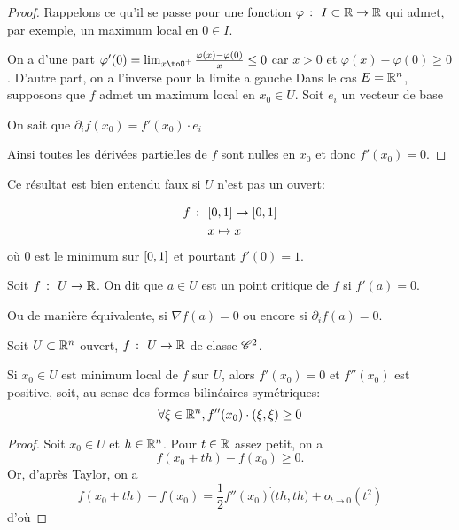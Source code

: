\begin{proof}
    Rappelons ce qu'il se passe pour une fonction \(\varphi\ \colon\ I\subset \mathbb{R}\to\mathbb{R}\) qui
    admet, par exemple, un maximum local en \(0\in I\).

    On a d'une part \(\varphi'(0) = \lim_{x\toO^+}\frac{\varphi(x)-\varphi(0)}{x}\leq 0\)
    car \(x>0\) et \(\varphi(x) - \varphi(0)\geq 0\).
    D'autre part, on a l'inverse pour la limite a gauche %
    Dans le cas \(E = \mathbb{R}^n\), supposons que \(f\) admet un maximum local en \(x_0\in U\).
    Soit \(e_i\) un vecteur de base

    On sait que \(\partial_i f(x_0) = f'(x_0)\cdot e_i\) %


    Ainsi toutes les dérivées partielles de \(f\) sont nulles en \(x_0\) et donc
    \(f'(x_0) = 0\).
\end{proof}

\begin{remark}
    Ce résultat est bien entendu faux si \(U\) n'est pas un ouvert:

    \begin{equation*}
        \begin{aligned}
            f\ \colon\  &\mathopen{}\left[0,1\right]\mathclose{}\to\mathopen{}\left[0,1\right]\mathclose{}\\
            &x\mapsto x
        \end{aligned}
    \end{equation*}
    où 0 est le minimum sur \(\mathopen{}\left[0,1\right]\mathclose{}\) et pourtant \(f'(0)=1\).
\end{remark}

\begin{definition}
    Soit \(f\ \colon\  U\to \mathbb{R}\). On dit que \(a\in U\) est un point critique de \(f\) si \(f'(a)=0\).

    Ou de manière équivalente, si \(\nabla f(a) = 0\) ou encore si \(\partial_i f(a) = 0\).
\end{definition}

\begin{theorem}
    Soit \(U\subset\mathbb{R}^n\) ouvert, \(f\ \colon\  U\to \mathbb{R}\) de classe \(\mathscr{C}^2\).

    Si \(x_0\in U\) est minimum local de \(f\) sur \(U\), alors \(f'(x_0) = 0\)
    et \(f''(x_0)\) est positive, soit, au sense des formes bilinéaires symétriques:
    \begin{equation*}
        \forall \xi\in\mathbb{R}^n,f''(x_0)\cdot(\xi, \xi)\geq 0
    \end{equation*}
\end{theorem}

\begin{proof}
    Soit \(x_0\in U\) et \(h\in\mathbb{R}^n\). Pour \(t\in\mathbb{R}\) assez petit, on a
    \begin{equation*}
        f(x_0+th) -f(x_0)\geq 0.
    \end{equation*}
    Or, d'après Taylor, on a
    \begin{equation*}
        f(x_0+th) -f(x_0) = \frac12 f''(x_0)\dot(th, th) + o_{t\to 0}(t^2) %
    \end{equation*}
    d'où
\end{proof}